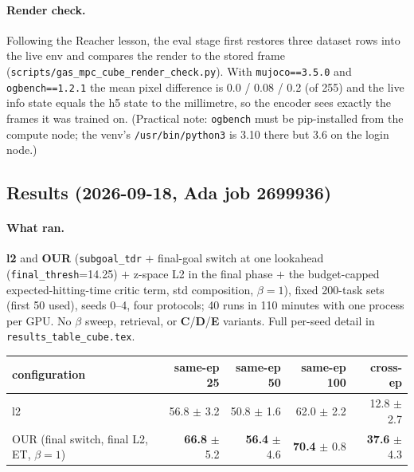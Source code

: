 \documentclass[11pt]{article}
\begin{document}
\paragraph{Render check.} Following the Reacher lesson, the eval stage first restores three
dataset rows into the live env and compares the render to the stored frame
(\texttt{scripts/gas\_mpc\_cube\_render\_check.py}). With \texttt{mujoco==3.5.0} and
\texttt{ogbench==1.2.1} the mean pixel difference is 0.0 / 0.08 / 0.2 (of 255) and the live
info state equals the h5 state to the millimetre, so the encoder sees exactly the frames it
was trained on. (Practical note: \texttt{ogbench} must be pip-installed from the compute
node; the venv's \texttt{/usr/bin/python3} is 3.10 there but 3.6 on the login node.)

\subsection{Results (2026-09-18, Ada job 2699936)}
\paragraph{What ran.} \textbf{l2} and \textbf{OUR} (\texttt{subgoal\_tdr} $+$ final-goal switch at
one lookahead (\texttt{final\_thresh}=14.25) $+$ z-space L2 in the final phase $+$ the
budget-capped expected-hitting-time critic term, std composition, $\beta=1$), fixed 200-task
sets (first 50 used), seeds 0--4, four protocols; 40 runs in 110 minutes with one process per
GPU. No $\beta$ sweep, retrieval, or \textbf{C}/\textbf{D}/\textbf{E} variants. Full per-seed
detail in \texttt{results\_table\_cube.tex}.

\begin{center}\small
\begin{tabular}{lrrrr}
\toprule
configuration & same-ep 25 & same-ep 50 & same-ep 100 & cross-ep \\
\midrule
l2 & 56.8 $\pm$ 3.2 & 50.8 $\pm$ 1.6 & 62.0 $\pm$ 2.2 & 12.8 $\pm$ 2.7 \\
OUR (final switch, final L2, ET, $\beta=1$) & \textbf{66.8} $\pm$ 5.2 & \textbf{56.4} $\pm$ 4.6 & \textbf{70.4} $\pm$ 0.8 & \textbf{37.6} $\pm$ 4.3 \\
\bottomrule
\end{tabular}
\end{center}
\end{document}
